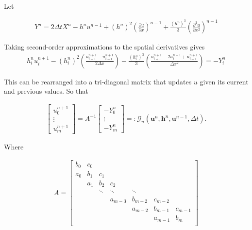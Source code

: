 \documentclass[12pt]{article}
\begin{document}
Let

	\begin{gather}
	Y^n = 2\Delta tX^{n} - h^{n}u^{n-1} + \left(h^{n}\right)^2\left(\frac{\partial u}{\partial x}\right)^{n-1} + \frac{\left(h^{n}\right)^3}{3}\left(\frac{\partial^2 u}{\partial x^2}\right)^{n-1}
	\label{eq:expandfactor Xp}
	\end{gather}


Taking second-order approximations to the spatial derivatives gives
\begin{gather}
	h^{n}_iu^{n+1}_i - \left(h^{n}_i\right)^2 \left(\frac{u^{n+1}_{i+1} -u^{n+1}_{i-1} }{2 \Delta x}\right) - \frac{\left(h^{n}_i\right)^3}{3}\left(\frac{u^{n+1}_{i+1} - 2u^{n+1}_{i} + u^{n+1}_{i-1} }{\Delta x^2}\right) = - Y^n_i 
	\label{eq:expandedutdisc3}
	\end{gather}

This can be rearranged into a tri-diagonal matrix that updates $u$ given its current and previous values. So that

	\begin{gather*}
	\left[\begin{array}{c}
	u^{n+1}_0 \\
	\vdots \\
	u^{n+1}_m \end{array}\right]
	= A^{-1} \left[\begin{array}{c}
	-Y^n_0 \\
	\vdots \\
	-Y^n_m \end{array}\right] =: \mathcal{G}_u\left(\boldsymbol{u}^n,\boldsymbol{h}^n, \boldsymbol{u}^{n-1}, \Delta t \right).
	\end{gather*}

Where

	\begin{gather*}
	A =
	\left[\begin{array}{ccccccccc}
	b_0 & c_0 &  & & & &  \\
	a_0 & b_1 & c_1 &  & & & \\
	& a_1 & b_2 & c_2 &  & &   \\
	&  &\ddots &\ddots &\ddots & & \\
	&  &  & a_{m-3} & b_{m-2} & c_{m-2} & \\
	&  &  &  & a_{m-2} & b_{m-1} & c_{m-1} \\
	&  &  & &  & a_{m-1} & b_{m}\\
	\end{array}\right]
	\end{gather*}
\end{document}

